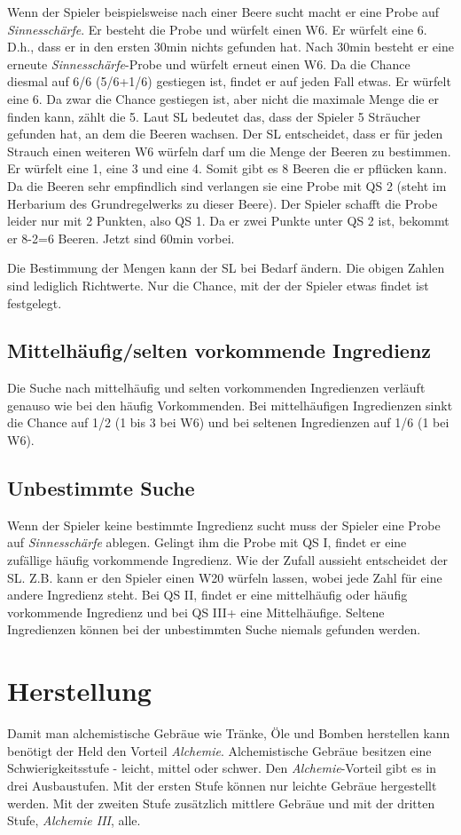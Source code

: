 Wenn der Spieler beispielsweise nach einer Beere sucht macht er eine Probe auf \textit{Sinnesschärfe}. Er besteht die Probe und würfelt einen W6. Er würfelt eine 6. D.h., dass er in den ersten 30min nichts gefunden hat. Nach 30min besteht er eine erneute \textit{Sinnesschärfe}-Probe und würfelt erneut einen W6. Da die Chance diesmal auf 6/6 (5/6+1/6) gestiegen ist, findet er auf jeden Fall etwas. Er würfelt eine 6. Da zwar die Chance gestiegen ist, aber nicht die maximale Menge die er finden kann, zählt die 5. Laut SL bedeutet das, dass der Spieler 5 Sträucher gefunden hat, an dem die Beeren wachsen. Der SL entscheidet, dass er für jeden Strauch einen weiteren W6 würfeln darf um die Menge der Beeren zu bestimmen. Er würfelt eine 1, eine 3 und eine 4. Somit gibt es 8 Beeren die er pflücken kann. Da die Beeren sehr empfindlich sind verlangen sie eine Probe mit QS 2 (steht im Herbarium des Grundregelwerks zu dieser Beere). Der Spieler schafft die Probe leider nur mit 2 Punkten, also QS 1. Da er zwei Punkte unter QS 2 ist, bekommt er 8-2=6 Beeren. Jetzt sind 60min vorbei.

Die Bestimmung der Mengen kann der SL bei Bedarf ändern. Die obigen Zahlen sind lediglich Richtwerte. Nur die Chance, mit der der Spieler etwas findet ist festgelegt.

\subsection{Mittelhäufig/selten vorkommende Ingredienz}
Die Suche nach mittelhäufig und selten vorkommenden Ingredienzen verläuft genauso wie bei den häufig Vorkommenden. Bei mittelhäufigen Ingredienzen sinkt die Chance auf 1/2 (1 bis 3 bei W6) und bei seltenen Ingredienzen auf 1/6 (1 bei W6).

\subsection{Unbestimmte Suche}
Wenn der Spieler keine bestimmte Ingredienz sucht muss der Spieler eine Probe auf \textit{Sinnesschärfe} ablegen. Gelingt ihm die Probe mit QS I, findet er eine zufällige häufig vorkommende Ingredienz. Wie der Zufall aussieht entscheidet der SL. Z.B. kann er den Spieler einen W20 würfeln lassen, wobei jede Zahl für eine andere Ingredienz steht. Bei QS II, findet er eine mittelhäufig oder häufig vorkommende Ingredienz und bei QS III+ eine Mittelhäufige. Seltene Ingredienzen können bei der unbestimmten Suche niemals gefunden werden.

\section{Herstellung}
Damit man alchemistische Gebräue wie Tränke, Öle und Bomben herstellen kann benötigt der Held den Vorteil \textit{Alchemie}. Alchemistische Gebräue besitzen eine Schwierigkeitsstufe - leicht, mittel oder schwer. Den \textit{Alchemie}-Vorteil gibt es in drei Ausbaustufen. Mit der ersten Stufe können nur leichte Gebräue hergestellt werden. Mit der zweiten Stufe zusätzlich mittlere Gebräue und mit der dritten Stufe, \textit{Alchemie III}, alle. 

